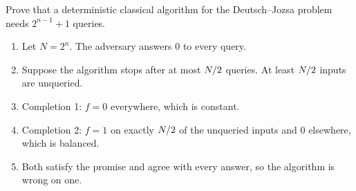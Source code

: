 \begin{exercisebox}
\begin{pproblem}\label{pp:dj-lb}
    Prove that a deterministic classical algorithm for the Deutsch--Jozsa problem needs
    $2^{n-1} + 1$ queries.
\end{pproblem}
\tcblower
\begin{wsolution}
    \leavevmode
    \begin{enumerate}
        \item Let $N = 2^n$. The adversary answers $0$ to every query.
        \item Suppose the algorithm stops after at most $N/2$ queries. At least
              $N/2$ inputs are unqueried.
        \item Completion 1: $f = 0$ everywhere, which is constant.
        \item Completion 2: $f = 1$ on exactly $N/2$ of the unqueried inputs and $0$
              elsewhere, which is balanced.
        \item Both satisfy the promise and agree with every answer, so the algorithm is wrong on one. \qedhere
    \end{enumerate}
\end{wsolution}
\end{exercisebox}

